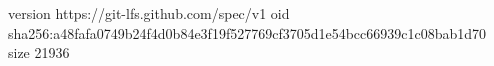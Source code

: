 version https://git-lfs.github.com/spec/v1
oid sha256:a48fafa0749b24f4d0b84e3f19f527769cf3705d1e54bcc66939c1c08bab1d70
size 21936
